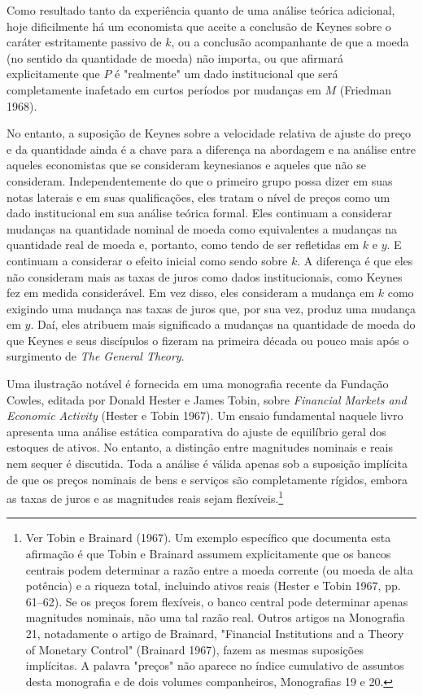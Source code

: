 \documentclass[12pt]{article}
\begin{document}
Como resultado tanto da experiência quanto de uma análise teórica adicional, hoje dificilmente há um economista que aceite a conclusão de Keynes sobre o caráter estritamente passivo de $k$, ou a conclusão acompanhante de que a moeda (no sentido da quantidade de moeda) não importa, ou que afirmará explicitamente que $P$ é "realmente" um dado institucional que será completamente inafetado em curtos períodos por mudanças em $M$ (Friedman 1968).

No entanto, a suposição de Keynes sobre a velocidade relativa de ajuste do preço e da quantidade ainda é a chave para a diferença na abordagem e na análise entre aqueles economistas que se consideram keynesianos e aqueles que não se consideram. Independentemente do que o primeiro grupo possa dizer em suas notas laterais e em suas qualificações, eles tratam o nível de preços como um dado institucional em sua análise teórica formal. Eles continuam a considerar mudanças na quantidade nominal de moeda como equivalentes a mudanças na quantidade real de moeda e, portanto, como tendo de ser refletidas em $k$ e $y$. E continuam a considerar o efeito inicial como sendo sobre $k$. A diferença é que eles não consideram mais as taxas de juros como dados institucionais, como Keynes fez em medida considerável. Em vez disso, eles consideram a mudança em $k$ como exigindo uma mudança nas taxas de juros que, por sua vez, produz uma mudança em $y$. Daí, eles atribuem mais significado a mudanças na quantidade de moeda do que Keynes e seus discípulos o fizeram na primeira década ou pouco mais após o surgimento de \textit{The General Theory}.

Uma ilustração notável é fornecida em uma monografia recente da Fundação Cowles, editada por Donald Hester e James Tobin, sobre \textit{Financial Markets and Economic Activity} (Hester e Tobin 1967). Um ensaio fundamental naquele livro apresenta uma análise estática comparativa do ajuste de equilíbrio geral dos estoques de ativos. No entanto, a distinção entre magnitudes nominais e reais nem sequer é discutida. Toda a análise é válida apenas sob a suposição implícita de que os preços nominais de bens e serviços são completamente rígidos, embora as taxas de juros e as magnitudes reais sejam flexíveis.\footnote{Ver Tobin e Brainard (1967). Um exemplo específico que documenta esta afirmação é que Tobin e Brainard assumem explicitamente que os bancos centrais podem determinar a razão entre a moeda corrente (ou moeda de alta potência) e a riqueza total, incluindo ativos reais (Hester e Tobin 1967, pp. 61–62). Se os preços forem flexíveis, o banco central pode determinar apenas magnitudes nominais, não uma tal razão real. Outros artigos na Monografia 21, notadamente o artigo de Brainard, "Financial Institutions and a Theory of Monetary Control" (Brainard 1967), fazem as mesmas suposições implícitas. A palavra "preços" não aparece no índice cumulativo de assuntos desta monografia e de dois volumes companheiros, Monografias 19 e 20.}
\end{document}

